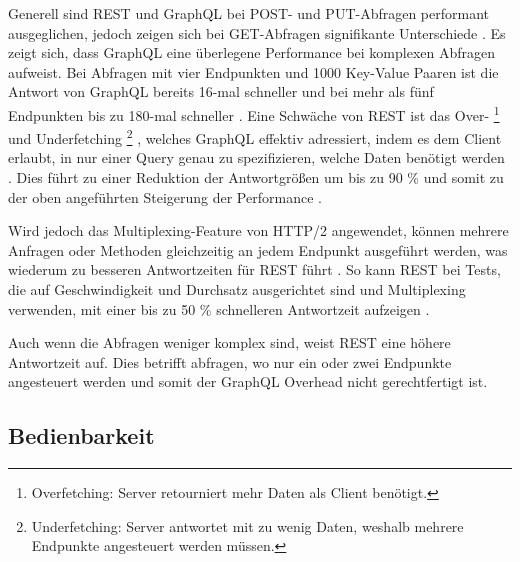 \documentclass[draft,final]{vutinfth} %
\begin{document}
Generell sind REST und GraphQL bei POST- und PUT-Abfragen performant ausgeglichen, jedoch zeigen sich bei GET-Abfragen signifikante Unterschiede \cite{Vohra:2022:GraphVsRestImplementation}.
Es zeigt sich, dass GraphQL eine überlegene Performance bei komplexen Abfragen aufweist.
Bei Abfragen mit vier Endpunkten und 1000 Key-Value Paaren ist die Antwort von GraphQL bereits 16-mal schneller und bei mehr als fünf Endpunkten bis zu 180-mal schneller \cite{Quinamera:2023:GraphMappingStudy}.
Eine Schwäche von REST ist das Over-
\footnote{
	Overfetching: Server retourniert mehr Daten als Client benötigt.
}
und Underfetching
\footnote{
	Underfetching: Server antwortet mit zu wenig Daten, weshalb mehrere Endpunkte angesteuert werden müssen.
}
, welches GraphQL effektiv adressiert, indem es dem Client erlaubt, in nur einer Query genau zu spezifizieren, welche Daten benötigt werden \cite{Brito:2019:MigratingToGraphQL}. 
Dies führt zu einer Reduktion der Antwortgrößen um bis zu 90 \% und somit zu der oben angeführten Steigerung der Performance \cite{Brito:2019:MigratingToGraphQL}.

Wird jedoch das Multiplexing-Feature von HTTP/2 angewendet, können mehrere Anfragen oder Methoden gleichzeitig an jedem Endpunkt ausgeführt werden, was wiederum zu besseren Antwortzeiten für REST führt \cite{Lawi:2021:GraphVsRestPerformance}.
So kann REST bei Tests, die auf Geschwindigkeit und Durchsatz ausgerichtet sind und Multiplexing verwenden, mit einer bis zu 50 \% schnelleren Antwortzeit aufzeigen \cite{Lawi:2021:GraphVsRestPerformance}.

Auch wenn die Abfragen weniger komplex sind, weist REST eine höhere Antwortzeit auf. 
Dies betrifft abfragen, wo nur ein oder zwei Endpunkte angesteuert werden und somit der GraphQL Overhead nicht gerechtfertigt ist. \cite{Quinamera:2023:GraphMappingStudy}


\subsection{Bedienbarkeit}






\end{document}
